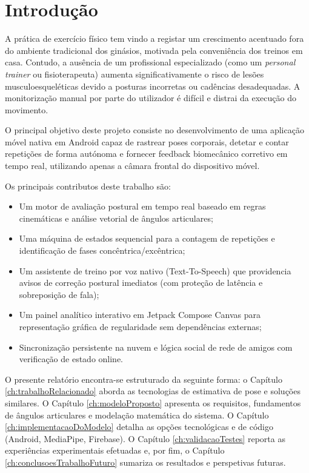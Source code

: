 
\chapter{Introdução}
\label{ch:introducao}

A prática de exercício físico tem vindo a registar um crescimento acentuado fora do ambiente tradicional dos ginásios, motivada pela conveniência dos treinos em casa. Contudo, a ausência de um profissional especializado (como um \textit{personal trainer} ou fisioterapeuta) aumenta significativamente o risco de lesões musculoesqueléticas devido a posturas incorretas ou cadências desadequadas. A monitorização manual por parte do utilizador é difícil e distrai da execução do movimento.

O principal objetivo deste projeto consiste no desenvolvimento de uma aplicação móvel nativa em Android capaz de rastrear poses corporais, detetar e contar repetições de forma autónoma e fornecer feedback biomecânico corretivo em tempo real, utilizando apenas a câmara frontal do dispositivo móvel. 

Os principais contributos deste trabalho são:
\begin{itemize}
    \item Um motor de avaliação postural em tempo real baseado em regras cinemáticas e análise vetorial de ângulos articulares;
    \item Uma máquina de estados sequencial para a contagem de repetições e identificação de fases concêntrica/excêntrica;
    \item Um assistente de treino por voz nativo (Text-To-Speech) que providencia avisos de correção postural imediatos (com proteção de latência e sobreposição de fala);
    \item Um painel analítico interativo em Jetpack Compose Canvas para representação gráfica de regularidade sem dependências externas;
    \item Sincronização persistente na nuvem e lógica social de rede de amigos com verificação de estado online.
\end{itemize}

O presente relatório encontra-se estruturado da seguinte forma: o Capítulo \ref{ch:trabalhoRelacionado} aborda as tecnologias de estimativa de pose e soluções similares. O Capítulo \ref{ch:modeloProposto} apresenta os requisitos, fundamentos de ângulos articulares e modelação matemática do sistema. O Capítulo \ref{ch:implementacaoDoModelo} detalha as opções tecnológicas e de código (Android, MediaPipe, Firebase). O Capítulo \ref{ch:validacaoTestes} reporta as experiências experimentais efetuadas e, por fim, o Capítulo \ref{ch:conclusoesTrabalhoFuturo} sumariza os resultados e perspetivas futuras.


